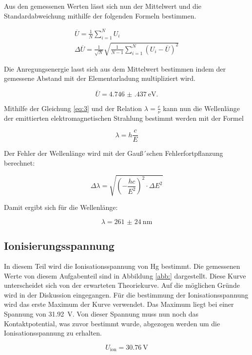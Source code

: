 Aus den gemessenen Werten lässt sich nun der Mittelwert und die Standardabweichung
mithilfe der folgenden Formeln bestimmen.

\begin{gather*}
  \overline{U} = \frac{1}{N} \sum^N_{i=1} U_i \\
  \Delta \overline{U} = \frac{1}{\sqrt{N}} \sqrt{\frac{1}{N-1} \sum^N_{i=1}(U_i-\overline{U})^2}
\end{gather*}

Die Anregungsenergie lasst sich aus dem Mittelwert bestimmen indem der gemessene Abstand
mit der Elementarladung multipliziert wird.

\begin{equation*}
  \overline{U} = \SI{4.746(437)}{\electronvolt}.
\end{equation*}

Mithilfe der Gleichung \ref{eq:3} und der Relation $\lambda = \frac{c}{\nu}$ kann
nun die Wellenlänge der emittierten elektromagnetischen Strahlung bestimmt werden
mit der Formel

\begin{equation*}
  \lambda = h \frac{c}{E}
\end{equation*}

Der Fehler der Wellenlänge wird mit der Gauß´schen Fehlerfortpflanzung berechnet:

\begin{equation*}
  \Delta \lambda = \sqrt{\left(-\frac{hc}{E^2}\right)^2 \cdot \Delta E^2}
\end{equation*}

Damit ergibt sich für die Wellenlänge:

\begin{equation*}
  \lambda = \SI{261(24)}{\nano\meter}
\end{equation*}

\subsection{Ionisierungsspannung}

In diesem Teil wird die Ionisationsspannung von Hg bestimmt. Die gemessenen Werte
von diesem Aufgabenteil sind in Abbildung \ref{abb:} dargestellt. Diese Kurve unterscheidet sich
von der erwarteten Theoriekurve. Auf die möglichen Gründe wird in der Diskussion eingegangen.
Für die bestimmung der Ionisationsspannung wird das erste Maximum der Kurve verwendet.
Das Maximum liegt bei einer Spannung von \SI{31.92}{\volt}. Von dieser Spannung muss nun noch
das Kontaktpotential, was zuvor bestimmt wurde, abgezogen werden um die Ionisationsspannung
zu erhalten.

\begin{equation*}
  U_\text{ion} = \SI{30.76}{\volt}
\end{equation*}

